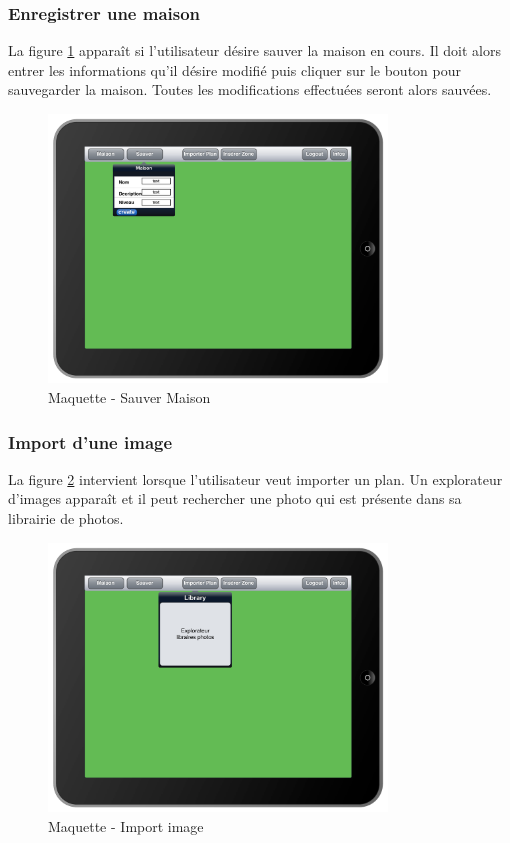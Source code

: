 \subsubsection{Enregistrer une maison}
La figure \ref{gra:maq04} apparaît si l'utilisateur désire sauver la maison en cours. Il doit alors entrer les informations qu'il désire modifié puis cliquer sur le bouton pour sauvegarder la maison. Toutes les modifications effectuées seront alors sauvées.
\begin{figure}[H]
      \centering
      \includegraphics[width=9cm]{00_media/04_Maquette_04.pdf}
      \caption{Maquette - Sauver Maison}
      \label{gra:maq04}
\end{figure}
\subsubsection{Import d'une image}
La figure \ref{gra:maq05} intervient lorsque l'utilisateur veut importer un plan. Un explorateur d'images apparaît et il peut rechercher une photo qui est présente dans sa librairie de photos.
\begin{figure}[H]
      \centering
      \includegraphics[width=9cm]{00_media/04_Maquette_05.pdf}
      \caption{Maquette - Import image}
      \label{gra:maq05}
\end{figure}
